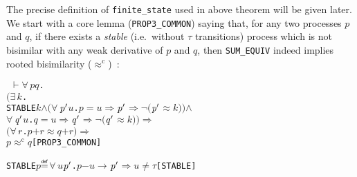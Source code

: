 \documentclass[GCNS]{yincog}
\renewcommand{\HOLinline}[1]{\mbox{\textup{\texttt{#1}}}}
\renewcommand{\HOLConst}[1]{\texttt{#1}}
\renewcommand{\HOLBoundVar}[1]{\ensuremath{\mathit{#1}}}
\renewcommand{\HOLFreeVar}[1]{\ensuremath{\mathit{#1}}}
\renewcommand{\HOLSymConst}[1]{#1}
\renewcommand{\HOLTokenConj}{\ensuremath{\wedge}}
\renewcommand{\HOLTokenNeg}{\ensuremath{\neg}}
\renewcommand{\HOLTokenNotEqual}{\ensuremath{\neq}}
\renewcommand{\HOLTokenDefEquality}{\ensuremath{\mathrel{\overset{\makebox [0pt]{\text{\tiny \textsf{def}}}}{=}}}}
\renewcommand{\HOLTokenExists}{\ensuremath{\exists \,}}
\renewcommand{\HOLTokenForall}{\ensuremath{\forall \,}}
\renewcommand{\HOLTokenTurnstile}{\ensuremath{\:\:\vdash}}
\theoremstyle{remark}
\theoremstyle{theorem}
\theoremstyle{remark}
\newcommand{\HOLTokenWeakEQ}{$\approx$}
\newcommand{\HOLTokenObsCongr}{$\approx^{\mathrm{c}}\!$}
\newcommand{\HOLTokenTransBegin}{$-$}
\newcommand{\HOLTokenTransEnd}{$\rightarrow$\xspace}
\newcommand{\HOLTokenWeakTransBegin}{$=$}
\newcommand{\HOLTokenWeakTransEnd}{$\Rightarrow$\xspace}
\renewcommand{\HOLTokenImp}{\ensuremath{\Longrightarrow}}
\newcommand{\rapprox}{\mathrel{\approx^{\mathrm{c}}}}
\begin{document}
The precise definition of \texttt{finite\_state} used in above theorem will
be given later. We start with a core lemma (\texttt{PROP3\_COMMON}) saying
that, for any two processes $p$ and $q$, if there exists a
\emph{stable} (i.e.~without $\tau $ transitions) process which is not bisimilar
with any weak derivative of $p$ and $q$, then
\HOLinline{\HOLConst{SUM\_EQUIV}} indeed implies rooted bisimilarity ($
\rapprox $)~\cite{van2005characterisation,Tian:2017wrba}:
%
\begin{alltt}
\HOLTokenTurnstile{} \HOLSymConst{\HOLTokenForall{}}\HOLBoundVar{p} \HOLBoundVar{q}.
       \ensuremath{(}\HOLSymConst{\HOLTokenExists{}}\HOLBoundVar{k}.
            \HOLConst{STABLE} \HOLBoundVar{k} \HOLSymConst{\HOLTokenConj{}} \ensuremath{(}\HOLSymConst{\HOLTokenForall{}}\ensuremath{\HOLBoundVar{p}\sp{\prime}} \HOLBoundVar{u}. \HOLBoundVar{p} \HOLTokenWeakTransBegin\HOLBoundVar{u}\HOLTokenWeakTransEnd \ensuremath{\HOLBoundVar{p}\sp{\prime}} \HOLSymConst{\HOLTokenImp{}} \HOLSymConst{\HOLTokenNeg{}}\ensuremath{(}\ensuremath{\HOLBoundVar{p}\sp{\prime}} \HOLSymConst{\HOLTokenWeakEQ} \HOLBoundVar{k}\ensuremath{)}\ensuremath{)} \HOLSymConst{\HOLTokenConj{}}
            \HOLSymConst{\HOLTokenForall{}}\ensuremath{\HOLBoundVar{q}\sp{\prime}} \HOLBoundVar{u}. \HOLBoundVar{q} \HOLTokenWeakTransBegin\HOLBoundVar{u}\HOLTokenWeakTransEnd \ensuremath{\HOLBoundVar{q}\sp{\prime}} \HOLSymConst{\HOLTokenImp{}} \HOLSymConst{\HOLTokenNeg{}}\ensuremath{(}\ensuremath{\HOLBoundVar{q}\sp{\prime}} \HOLSymConst{\HOLTokenWeakEQ} \HOLBoundVar{k}\ensuremath{)}\ensuremath{)} \HOLSymConst{\HOLTokenImp{}}
       \ensuremath{(}\HOLSymConst{\HOLTokenForall{}}\HOLBoundVar{r}. \HOLBoundVar{p} \HOLSymConst{\ensuremath{+}} \HOLBoundVar{r} \HOLSymConst{\HOLTokenWeakEQ} \HOLBoundVar{q} \HOLSymConst{\ensuremath{+}} \HOLBoundVar{r}\ensuremath{)} \HOLSymConst{\HOLTokenImp{}}
       \HOLBoundVar{p} \HOLSymConst{\HOLTokenObsCongr} \HOLBoundVar{q}\hfill{[PROP3\_COMMON]}
\end{alltt}
%
\begin{alltt}
   \HOLConst{STABLE} \HOLFreeVar{p} \HOLTokenDefEquality{} \HOLSymConst{\HOLTokenForall{}}\HOLBoundVar{u} \ensuremath{\HOLBoundVar{p}\sp{\prime}}. \HOLFreeVar{p} \HOLTokenTransBegin\HOLBoundVar{u}\HOLTokenTransEnd \ensuremath{\HOLBoundVar{p}\sp{\prime}} \HOLSymConst{\HOLTokenImp{}} \HOLBoundVar{u} \HOLSymConst{\HOLTokenNotEqual{}} \HOLSymConst{\ensuremath{\tau}}\hfill{[STABLE]}
\end{alltt}
\end{document}
